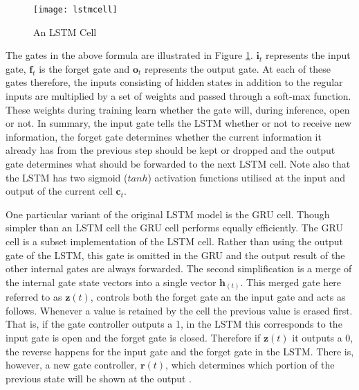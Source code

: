 \begin{figure}
\centering
  \texttt{[image: lstmcell]}\\
  \caption{An LSTM Cell \cite{graves2013hybrid}}\label{fig_3_3_lstmcell}
\end{figure}

The gates in the above formula are illustrated in Figure \ref{fig_3_3_lstmcell}.  $\mathbf{i}_t$ represents the input gate, $\mathbf{f}_t$ is the forget gate and $\mathbf{o}_t$ represents the output gate.  At each of these gates therefore, the inputs consisting of hidden states in addition to the regular inputs are multiplied by a set of weights and passed through a soft-max function. These weights during training learn whether the gate will, during inference, open or not.  In summary, the input gate tells the LSTM whether or not to receive new information, the forget gate determines whether the current information it already has from the previous step should be kept or dropped and the output gate determines what should be forwarded to the next LSTM cell.  Note also that the LSTM has two sigmoid ($tanh$) activation functions utilised at the input and output of the current cell $\mathbf{c}_t$.

One particular variant of the original LSTM model is the GRU cell. Though simpler than an LSTM cell the GRU cell performs equally efficiently.   The GRU cell is a subset implementation of the LSTM cell.  Rather than using the output gate of the LSTM, this gate is omitted in the GRU and the output result of the other internal gates are always forwarded.  The second simplification is a merge of the internal gate state vectors into a single vector $\mathbf{h}_{(t)}$.  This merged gate here referred to as $\mathbf{z}(t)$, controls both the forget gate an the input gate and acts as follows. Whenever a value is retained by the cell the previous value is erased first.  That is, if the gate controller outputs a 1, in the LSTM this corresponds to the input gate is open and the forget gate is closed. Therefore if $\mathbf{z}(t)$ it outputs a 0, the reverse happens for the input gate and the forget gate in the LSTM.  There is, however, a new gate controller, $\mathbf{r}(t)$, which determines which portion of the previous state will be shown at the output \citep{cho2014learning}.

